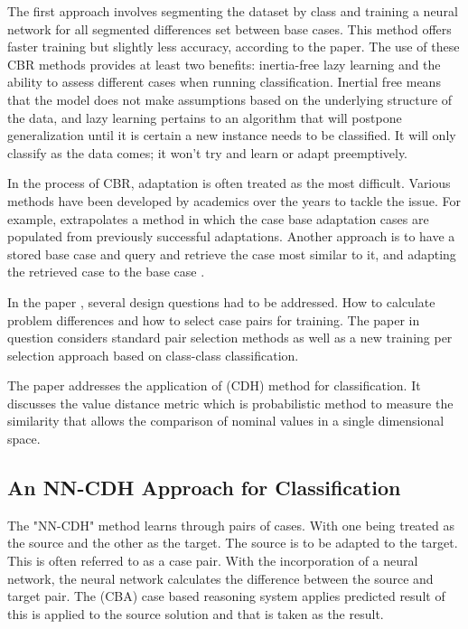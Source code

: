 \documentclass[a4paper, 12pt]{report}
\begin{document}
The first approach involves segmenting the dataset by class and training a neural network for all segmented differences set between base cases. 
This method offers faster training but slightly less accuracy, according to the paper. The use of these CBR methods provides at least two benefits: 
inertia-free lazy learning and the ability to assess different cases when running classification. Inertial free means that the model does not make 
assumptions based on the underlying structure of the data, and lazy learning pertains to an algorithm that will postpone generalization until it 
is certain a new instance needs to be classified. It will only classify as the data comes; it won't try and learn or adapt preemptively.

In the process of CBR, adaptation is often treated as the most difficult. Various methods have been developed by academics over the years to tackle the issue. 
For example, \cite{leake1996acquiring} extrapolates a method in which the case base adaptation cases are populated from previously successful adaptations. 
Another approach is to have a stored base case and query and retrieve the case most similar to it, 
and adapting the retrieved case to the base case \cite{craw2006learning}.

In the paper \cite{ye2021learning}, several design questions had to be addressed. 
How to calculate problem differences and how to select case pairs for training. The paper in question \cite{ye2021learning} considers standard 
pair selection methods as well as a new training per selection approach based on class-class classification.

The paper \cite{ye2021learning} addresses the application of (CDH) method for classification. 
It discusses the value distance metric which is  probabilistic method 
to measure the similarity that allows the comparison of nominal values in a single dimensional space.

\subsection{An NN-CDH Approach for Classification}
The "NN-CDH" method learns through pairs of cases. With one being treated as the source and the other as the target. The source is to be adapted to the target. This is often referred to as a case pair.
With the incorporation of a neural network, the neural network calculates the difference between the source and target pair. 
The (CBA) case based reasoning system applies predicted result of this is applied to the source solution and that is taken as the result.
\end{document}
